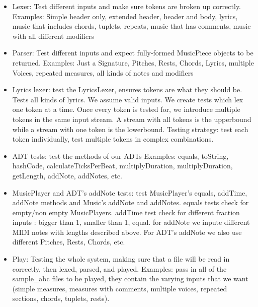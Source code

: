 \documentclass[12pt]{book}
\begin{document}
\begin{itemize}
\item Lexer: Test different inputs and make sure tokens are broken up correctly. 
Examples: Simple header only, extended header, header and body, lyrics, music that includes chords, tuplets, repeats, music that has comments, music with all different modifiers
\item Parser: Test different inputs and expect fully-formed MusicPiece objects to be returned. 
Examples: Just a Signature, Pitches, Rests, Chords, Lyrics, multiple Voices, repeated measures, all kinds of notes and modifiers

\item Lyrics lexer: test the LyricsLexer, ensures tokens are what they should be. Tests all kinds of lyrics. We assume valid inputs. We create tests which lex one token at a time. Once every token is tested for, we introduce multiple tokens in the same input stream. A stream with all tokens is the upperbound while a stream with one token is the lowerbound. Testing strategy: test each token individually, test multiple tokens in complex combinations.

\item ADT tests: test the methods of our ADTs
Examples: equals, toString, hashCode, calculateTicksPerBeat, multiplyDuration, multiplyDuration, getLength, addNote, addNotes, etc.

\item MusicPlayer and ADT's addNote tests: test MusicPlayer's equals, addTime, addNote methods  and Music's addNote and addNotes. 
equals tests check for empty/non empty MusicPlayers. addTime test check for different fraction inputs : bigger than 1, smaller than 1, equal. for addNote we inpute different MIDI notes with lengths described above. For ADT's addNote we also use different Pitches, Rests, Chords, etc.

\item Play: Testing the whole system, making sure that a file will be read in correctly, then lexed, parsed, and played.
Examples: pass in all of the sample\_abc files to be played, they contain the varying inputs that we want (simple measures, measures with comments, multiple voices, repeated sections, chords, tuplets, rests).
\end{itemize}






\newpage
\end{document}
